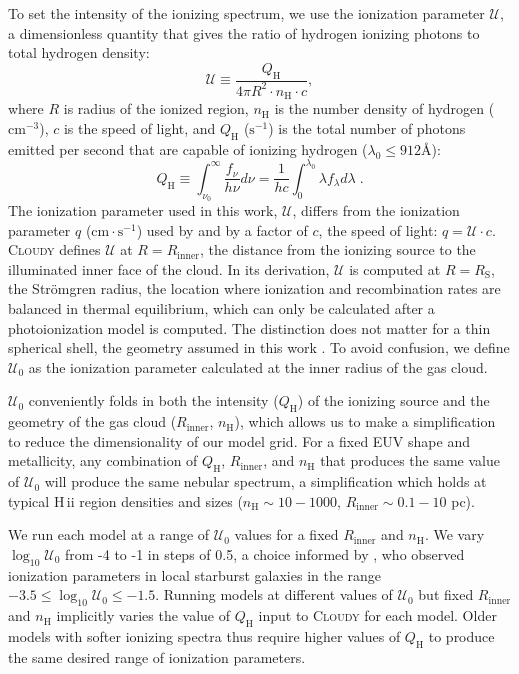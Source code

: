 \documentclass[twocolumn, tighten]{aastex61}
\newcommand{\strom}{Str{\"o}mgren}
\newcommand{\Cloudy}{\textsc{Cloudy}\xspace}
\newcommand{\logten}{\ensuremath{\log_{10}}}
\newcommand{\hii}{H\,{\sc ii}\xspace}
\newcommand{\nH}{\ensuremath{n_{\mathrm{H}}}}
\newcommand{\cm}[1]{\ensuremath{\mathrm{cm}^{#1}}}
\newcommand{\ang}{\ensuremath{\mbox{\AA}}}
\newcommand{\Rin}{\ensuremath{R_{\mathrm{inner}}}}
\newcommand{\QH}{\ensuremath{Q_{\mathrm{H}}}}
\newcommand{\U}{\ensuremath{\mathcal{U}_{0}}}
\newcommand{\Rs}{\ensuremath{R_{\mathrm{S}}}}
\newcommand\s[1]{\ensuremath{\mathrm{s}^{#1}}}
\newcommand\cms{\ensuremath{\mathrm{cm} \cdot \mathrm{s}^{-1}}}
\newcommand{\logU}{\ensuremath{\logten \mathcal{U}_0}}
\begin{document}
To set the intensity of the ionizing spectrum, we use the ionization parameter $\mathcal{U}$, a dimensionless quantity that gives the ratio of hydrogen ionizing photons to total hydrogen density:
\begin{equation}\label{eq:logU}
    \mathcal{U} \equiv \frac{\QH{}}{4 \pi R^2 \cdot \nH \cdot c},
\end{equation}
where $R$ is radius of the ionized region, \nH{} is the number density of hydrogen (\cm{-3}), $c$ is the speed of light, and \QH{} (\s{-1}) is the total number of photons emitted per second that are capable of ionizing hydrogen ($\lambda_0 \leq 912 \ang$):
\begin{equation}\label{eq:Q}
    \QH{} \equiv \int_{\nu_0}^{\infty}\frac{f_{\nu}}{h \nu} d\nu = \frac{1}{hc} \int_0^{\lambda_0}\lambda f_{\lambda}d\lambda\;.
\end{equation}
The ionization parameter used in this work, $\mathcal{U}$, differs from the ionization parameter $q$ (\cms) used by \citet{Levesque10} and \citet{Dopita13} by a factor of $c$, the speed of light: $q = \mathcal{U} \cdot c$. \Cloudy defines $\mathcal{U}$ at $R = \Rin$, the distance from the ionizing source to the illuminated inner face of the cloud. In its derivation, $\mathcal{U}$ is computed at $R = \Rs$, the \strom{} radius, the location where ionization and recombination rates are balanced in thermal equilibrium, which can only be calculated after a photoionization model is computed. The distinction does not matter for a thin spherical shell, the geometry assumed in this work \citep[for details see][]{CL01}. To avoid confusion, we define \U{} as the ionization parameter calculated at the inner radius of the gas cloud.

\U{} conveniently folds in both the intensity (\QH{}) of the ionizing source and the geometry of the gas cloud (\Rin{}, \nH{}), which allows us to make a simplification to reduce the dimensionality of our model grid. For a fixed EUV shape and metallicity, any combination of \QH{}, \Rin{}, and \nH{} that produces the same value of \U{} will produce the same nebular spectrum, a simplification which holds at typical \hii region densities and sizes ($\nH{} \sim 10-1000$, $\Rin \sim 0.1-10$ pc). 

We run each model at a range of \U{} values for a fixed \Rin{} and \nH{}. We vary \logU{} from -4 to -1 in steps of 0.5, a choice informed by \citet{Rigby04}, who observed ionization parameters in local starburst galaxies in the range $-3.5 \leq \logU \leq -1.5$. Running models at different values of \U{} but fixed \Rin{} and \nH{} implicitly varies the value of \QH{} input to \Cloudy for each model. Older models with softer ionizing spectra thus require higher values of \QH{} to produce the same desired range of ionization parameters. 
\end{document}
